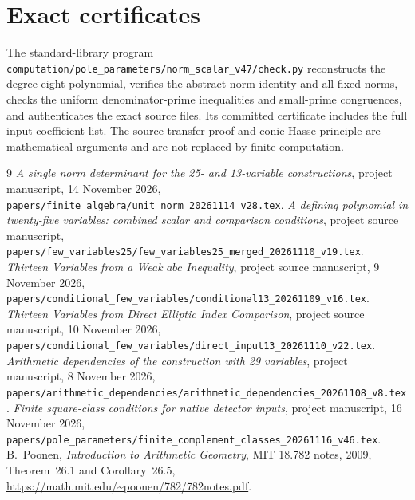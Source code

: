 \documentclass[11pt,a4paper]{article}
\begin{document}
\section{Exact certificates}
The standard-library program
\nolinkurl{computation/pole_parameters/norm_scalar_v47/check.py}
reconstructs the degree-eight polynomial, verifies the abstract norm
identity and all fixed norms, checks the uniform denominator-prime
inequalities and small-prime congruences, and authenticates the exact
source files. Its committed certificate includes the full input
coefficient list. The source-transfer proof and conic Hasse principle
are mathematical arguments and are not replaced by finite computation.

\begin{thebibliography}{9}
\emph{A single norm determinant for the 25- and 13-variable constructions},
project manuscript, 14 November 2026,
\nolinkurl{papers/finite_algebra/unit_norm_20261114_v28.tex}.
\emph{A defining polynomial in twenty-five variables: combined scalar
and comparison conditions}, project source manuscript,
\nolinkurl{papers/few_variables25/few_variables25_merged_20261110_v19.tex}.
\emph{Thirteen Variables from a Weak $abc$ Inequality},
project source manuscript, 9 November 2026,
\nolinkurl{papers/conditional_few_variables/conditional13_20261109_v16.tex}.
\emph{Thirteen Variables from Direct Elliptic Index Comparison},
project source manuscript, 10 November 2026,
\nolinkurl{papers/conditional_few_variables/direct_input13_20261110_v22.tex}.
\emph{Arithmetic dependencies of the construction with 29 variables},
project manuscript, 8 November 2026,
\nolinkurl{papers/arithmetic_dependencies/arithmetic_dependencies_20261108_v8.tex}.
\emph{Finite square-class conditions for native detector inputs},
project manuscript, 16 November 2026,
\nolinkurl{papers/pole_parameters/finite_complement_classes_20261116_v46.tex}.
B.~Poonen, \emph{Introduction to Arithmetic Geometry},
MIT 18.782 notes, 2009, Theorem~26.1 and Corollary~26.5,
\url{https://math.mit.edu/~poonen/782/782notes.pdf}.
\end{thebibliography}
\end{document}
